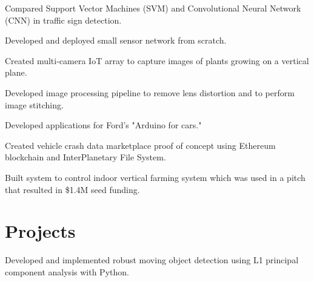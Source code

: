 \documentclass[]{deedy-resume-openfont}
\begin{document}
\begin{minipage}[t]{0.70\textwidth}
\begin{tightemize}
\item Compared Support Vector Machines (SVM) and Convolutional Neural Network (CNN) in traffic sign detection.
\item Developed and deployed small sensor network from scratch.

\end{tightemize}
\sectionsep

\begin{tightemize}
\item Created multi-camera IoT array to capture images of plants growing on a vertical plane.
\item Developed image processing pipeline to remove lens distortion and to perform image stitching.
\end{tightemize}
\sectionsep

\begin{tightemize}%

\item Developed applications for Ford's "Arduino for cars."
 
\item Created vehicle crash data marketplace proof of concept using Ethereum blockchain and InterPlanetary File System.

\end{tightemize}
\sectionsep

\begin{tightemize}
\item Built system to control indoor vertical farming system which was used in a pitch that resulted in \$1.4M seed funding.

\end{tightemize}
\sectionsep



\section{Projects}
\begin{tightemize}
\item Developed and implemented robust moving object detection using L1 principal component analysis with Python.
\end{tightemize}
\sectionsep


\end{minipage}
\end{document}
